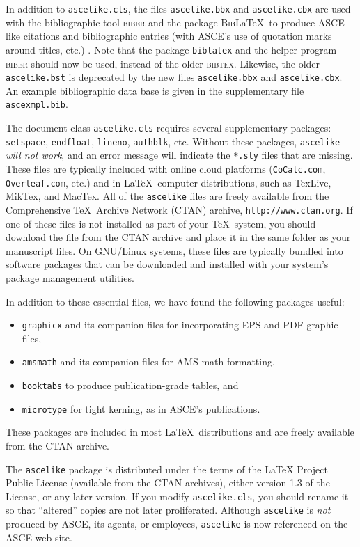 \documentclass[Proceedings]{ascelike}
\begin{document}
In addition to \texttt{ascelike.cls}, 
the files \texttt{ascelike.bbx} and \texttt{ascelike.cbx}
are used with
the bibliographic tool \textsc{biber} and the
package \textsc{Bib}\LaTeX\ to produce ASCE-like 
citations and bibliographic entries (with ASCE's use of
quotation marks around titles, etc.) \cite{Kuhn:2011a}.
Note that the package \texttt{biblatex} and the helper program 
\textsc{biber} should now be used, instead of the older
\textsc{bibtex}.
Likewise, the older \texttt{ascelike.bst} is deprecated by
the new files \texttt{ascelike.bbx} and \texttt{ascelike.cbx}.
An example bibliographic data base is given in the
supplementary file \texttt{ascexmpl.bib}.
\par
The document-class \texttt{ascelike.cls} requires several
supplementary packages:
\texttt{setspace}, 
\texttt{endfloat},
\texttt{lineno},
\texttt{authblk}, etc.
Without these packages, \texttt{ascelike} \emph{will not work},
and an error message will indicate the \texttt{*.sty} files that are missing.
These files are typically included with 
online cloud platforms (\verb+CoCalc.com+, \texttt{Overleaf.com}, etc.)
and in
\LaTeX\ computer distributions, such as
\textsf{TexLive}, \textsf{MikTex}, and \textsf{MacTex}.
All of the \texttt{ascelike} files are freely available
from the Comprehensive \TeX\ Archive Network (CTAN) archive,
\verb+http://www.ctan.org+.
If one of these files is not installed as part of your \TeX\ system,
you should download the file from the CTAN archive and place it in the same folder
as your manuscript files.
On GNU/Linux systems, these files are typically bundled
into software packages that can be downloaded and installed with
your system's package management utilities.
%
\par
In addition to these essential files,
we have found the following packages useful:
%
\begin{itemize}
\item
\texttt{graphicx} and its companion files for incorporating
EPS and PDF graphic files,
\item
\texttt{amsmath} and its companion files for AMS math formatting,
\item
\texttt{booktabs} to produce publication-grade tables, and
\item
\texttt{microtype} for tight kerning, as in ASCE's publications.
\end{itemize}
%
These packages 
are included in most \LaTeX\ distributions and
are freely 
available from the CTAN archive.
%
\par
The \texttt{ascelike} package is distributed under the
terms of the LaTeX Project Public License
(available from the CTAN archives),
either version 1.3 of the License, or any later version.
If you modify
\texttt{ascelike.cls}, you should rename it so that ``altered''
copies are not later proliferated.
Although \texttt{ascelike} is \emph{not} 
produced by ASCE, its agents,
or employees, \texttt{ascelike} is now referenced on
the ASCE web-site.
%
\end{document}
